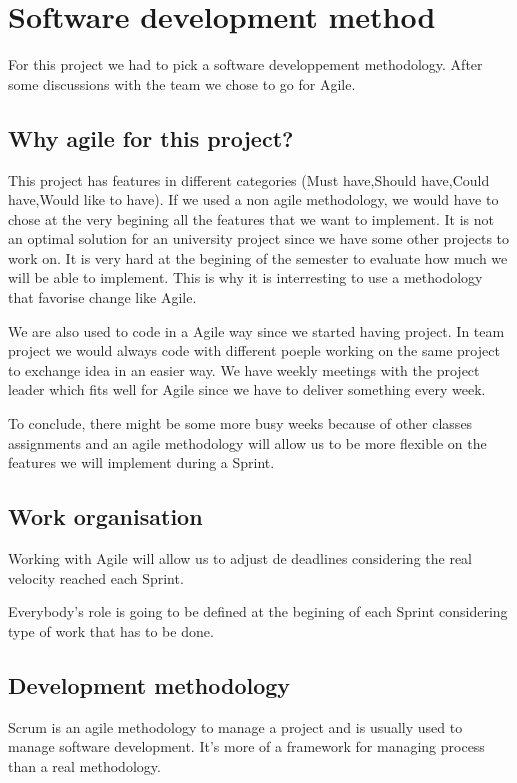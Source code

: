 \section{Software development method}

For this project we had to pick a software developpement methodology. After some discussions with the team we chose to go for Agile.

\subsection{Why agile for this project?}

This project has features in different categories (Must have,Should have,Could have,Would like to have). If we used a non agile methodology, we would have to chose at the very begining all the features that we want to implement.
It is not an optimal solution for an university project since we have some other projects to work on. It is very hard at the begining of the semester to evaluate how much we will be able to implement. This is why it is interresting to use a methodology that favorise change like Agile.\newline

We are also used to code in a Agile way since we started having project. In team project we would always code with different poeple working on the same project to exchange idea in an easier way.
We have weekly meetings with the project leader which fits well for Agile since we have to deliver something every week.\newline

To conclude, there might be some more busy weeks because of other classes assignments and an agile methodology will allow us to be more flexible on the features we will implement during a Sprint.

\subsection{Work organisation}
Working with Agile will allow us to adjust de deadlines considering the real velocity reached each Sprint.

Everybody's role is going to be defined at the begining of each Sprint considering type of work that has to be done.


\subsection{Development methodology}
Scrum is an agile methodology to manage a project and is usually used to manage software development. It's more of a framework for managing process than a real methodology.\newline

